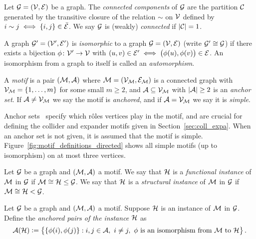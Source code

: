 \begin{definition}
Let $\mathcal{G} = (\mathcal{V,E})$ be a graph. The \emph{connected components} of $\mathcal{G}$ are the partition $\mathcal{C}$ generated by the transitive closure of the relation $\sim$ on $\mathcal{V}$ defined by $i \sim j \iff \{i,j\} \in \bar{\mathcal{E}}$. We say $\mathcal{G}$ is (weakly) \emph{connected} if $|\mathcal{C}| = 1$.
\end{definition}

\begin{definition}
A graph $\mathcal{G'} = (\mathcal{V',E'})$ is \emph{isomorphic} to a graph $\mathcal{G} = (\mathcal{V,E})$ (write $\mathcal{G'} \cong \mathcal{G}$) if there exists a bijection $\phi\colon \mathcal{V'} \rightarrow \mathcal{V}$ with $(u,v) \in \mathcal{E'} \iff \big(\phi(u), \phi(v) \big) \in \mathcal{E}$.
An isomorphism from a graph to itself is called an \emph{automorphism}.
\end{definition}

\begin{definition}
A \emph{motif} is a pair $(\mathcal{M,A})$ where $\mathcal{M} = (\mathcal{V_M,E_M})$ is a connected graph with $\mathcal{V_M} = \{ 1, \ldots, m \}$ for some small $m \geq 2$, and $\mathcal{A} \subseteq \mathcal{V_M}$ with $|\mathcal{A}| \geq 2$ is an \emph{anchor set}. If $\mathcal{A} \neq \mathcal{V_M}$ we say the motif is \emph{anchored}, and if $\mathcal{A=V_M}$ we say it is \emph{simple}.
\end{definition}

\begin{remark}
Anchor sets~\cite{benson2016higher} specify which r\^oles vertices play in the motif, and are crucial for defining the collider and expander motifs given in Section~\ref{sec:coll_expa}. When an anchor set is not given, it is assumed that the motif is simple. Figure~\ref{fig:motif_definitions_directed} shows all simple motifs (up to isomorphism) on at most three vertices. 
\end{remark}

\begin{definition}[Instances]
Let $\mathcal{G}$ be a graph and $(\mathcal{M,A})$ a motif. We say that $\mathcal{H}$ is a \emph{functional instance} of $\mathcal{M}$ in $\mathcal{G}$ if $\mathcal{M} \cong \mathcal{H} \leq \mathcal{G}$. We say that $\mathcal{H}$ is a \emph{structural instance} of $\mathcal{M}$ in $\mathcal{G}$ if $\mathcal{M} \cong \mathcal{H} < \mathcal{G}$.
\end{definition}

\begin{definition}
Let $\mathcal{G}$ be a graph and $(\mathcal{M,A})$ a motif. Suppose $\mathcal{H}$ is an instance of $\mathcal{M}$ in $\mathcal{G}$. Define the \emph{anchored pairs of the instance} $\mathcal{H}$ as
$$ \mathcal{A(H)} \vcentcolon = \big\{ \{\phi(i),\phi(j)\} : i,j \in \mathcal{A}, \ i \neq j, \ \phi \textrm{ is an isomorphism from } \mathcal{M} \textrm{ to } \mathcal{H} \big\}\,.$$

\end{definition}

